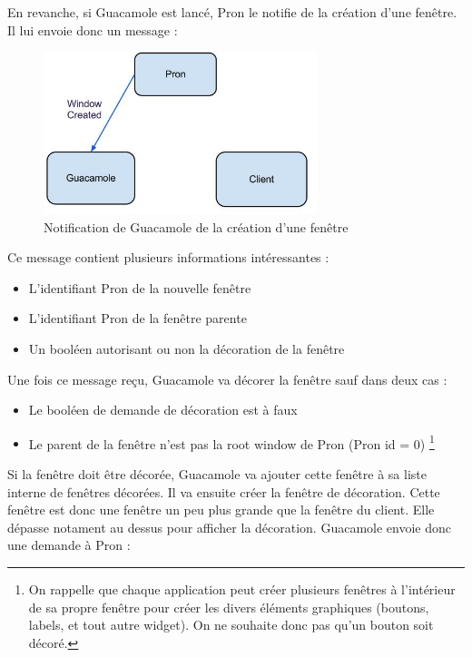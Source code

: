 En revanche, si Guacamole est lancé, Pron le notifie de la création d'une fenêtre. Il lui envoie donc un message :

\begin{figure}[H]
  \centering
  \includegraphics[width=8cm]{images/Guacamole_anim_3.jpg}
  \caption{Notification de Guacamole de la création d'une fenêtre}
  \label{fig:guacamole_anim_3}
\end{figure}

Ce message contient plusieurs informations intéressantes :

\begin{itemize}
  \item L'identifiant Pron de la nouvelle fenêtre
  \item L'identifiant Pron de la fenêtre parente
  \item Un booléen autorisant ou non la décoration de la fenêtre
\end{itemize}

Une fois ce message reçu, Guacamole va décorer la fenêtre sauf dans deux cas :

\begin{itemize}
  \item Le booléen de demande de décoration est à faux
  \item Le parent de la fenêtre n'est pas la root window de Pron (Pron id = 0)
            \footnote{On rappelle que chaque application peut créer plusieurs fenêtres à l'intérieur de sa propre fenêtre pour créer les divers éléments graphiques (boutons, labels, et tout autre widget). On ne souhaite donc pas qu'un bouton soit décoré.} 
\end{itemize}

Si la fenêtre doit être décorée, Guacamole va ajouter cette fenêtre à sa liste interne de fenêtres décorées.
Il va ensuite créer la fenêtre de décoration.
Cette fenêtre est donc une fenêtre un peu plus grande que la fenêtre du client.
Elle dépasse notament au dessus pour afficher la décoration.
Guacamole envoie donc une demande à Pron :

